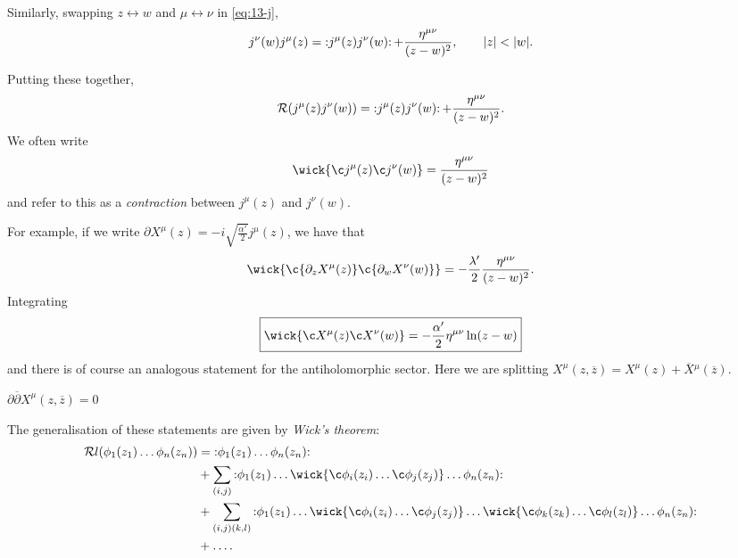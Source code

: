 
Similarly, swapping $z \leftrightarrow w$ and $\mu \leftrightarrow \nu$ in \eqref{eq:13-j},
\begin{equation}
  j^{\nu}(w) j^{\mu}(z) = \mathop{:}\nolimits\!j^{\mu}(z) j^{\nu}(w)\!\mathop{:}\nolimits + \frac{\eta^{\mu\nu}}{(z - w)^2},  \qquad \abs{z} < \abs{w}.
\end{equation}

Putting these together, 
\begin{equation}
  \mathcal{R} (j^{\mu}(z) j^{\nu}(w)) = \mathop{:}\nolimits\!j^{\mu}(z) j^{\nu}(w)\!\mathop{:}\nolimits + \frac{\eta^{\mu\nu}}{(z-w)^2}.
\end{equation}
We often write
\begin{equation}
  \wick{\c j^{\mu}(z) \c j^{\nu}(w)} = \frac{\eta^{\mu\nu}}{(z - w)^2}
\end{equation}
and refer to this as a \emph{contraction} between $j^{\mu}(z)$ and $j^{\nu}(w)$.

For example, if we write $\partial X ^{\mu}(z) = -i \sqrt{\frac{\alpha'}{2}} j^{\mu}(z)$, we have that
\begin{equation}
  \wick{\c {\partial_z X^{\mu}(z)} \c {\partial_w X^{\nu}(w)}} = -\frac{\lambda'}{2} \frac{\eta^{\mu\nu}}{(z-w)^2}.
\end{equation}
Integrating
\begin{equation}
  \boxed{\wick{\c X^{\mu}(z) \c X^{\nu}(w)} = -\frac{\alpha'}{2} \eta^{\mu\nu} \ln (z-w)}
\end{equation}
and there is of course an analogous statement for the antiholomorphic sector. 
Here we are splitting $X^{\mu}(z, \overline{z}{}) = X^{\mu}(z) + \overline{X}{}^{\mu}(\overline{z}{})$.
\begin{remark}
  $\partial \overline{\partial}{} X^{\mu}(z, \overline{z}{}) = 0$
\end{remark}

The generalisation of these statements are given by \emph{Wick's theorem}:
\begin{align}
  \mathcal{R} l(\phi_1(z_1) \dots \phi_n (z_n)) &= \normalorder{\phi_1(z_1) \dots \phi_n(z_n)} \\
						&+ \sum_{(i, j)} \normalorder{\phi_1 (z_1) \dots \wick{\c \phi_i(z_i) \dots \c \phi_j (z_j)} \dots \phi_n(z_n)} \\
						&+ \sum_{(i, j)(k, l)} \normalorder{\phi_1 (z_1) \dots \wick{\c \phi_i(z_i) \dots \c \phi_j (z_j)} \dots \wick{\c \phi_k(z_k) \dots \c \phi_l (z_l)} \dots \phi_n(z_n)}  \\
						&+ \dots.
\end{align}

